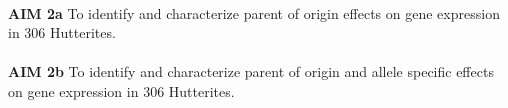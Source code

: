 \documentclass[a4paper, 11pt]{article}
\begin{document}
 \textbf{\\AIM 2a} To identify and characterize parent of origin effects on gene expression in 306 Hutterites.\\
 
 \textbf{\\AIM 2b} To identify and characterize parent of origin and allele specific effects on gene expression in 306 Hutterites.\\ 
 	



\end{document}
